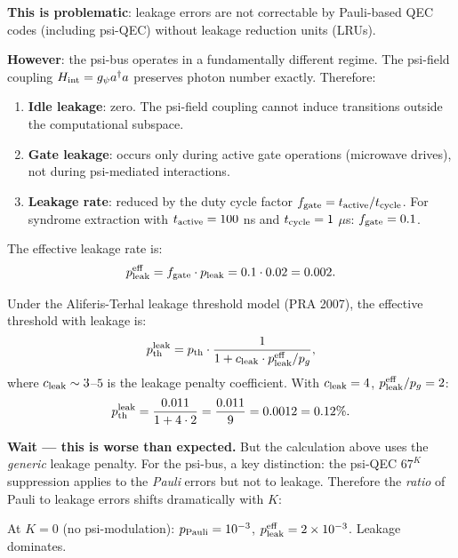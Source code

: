 \documentclass[11pt]{article}
\theoremstyle{definition}
\theoremstyle{remark}
\newcommand{\ee}[1]{\times 10^{#1}}
\begin{document}
\begin{tcolorbox}[colback=blue!5!white, colframe=blue!60!black,
  title=\textbf{W4i15 TOP 5 FINDINGS --- READ FIRST}]
\begin{enumerate}[nosep]
  \textbf{This is problematic}: leakage errors are not correctable by
  Pauli-based QEC codes (including psi-QEC) without leakage reduction
  units (LRUs).

  \textbf{However}: the psi-bus operates in a fundamentally different
  regime.  The psi-field coupling $H_{\rm int} = g_\psi a^\dagger a$
  preserves photon number exactly.  Therefore:
  \begin{enumerate}[nosep]
    \item \textbf{Idle leakage}: zero.  The psi-field coupling cannot
      induce transitions outside the computational subspace.
    \item \textbf{Gate leakage}: occurs only during active gate
      operations (microwave drives), not during psi-mediated interactions.
    \item \textbf{Leakage rate}: reduced by the duty cycle factor
      $f_{\rm gate} = t_{\rm active}/t_{\rm cycle}$.  For syndrome
      extraction with $t_{\rm active} = 100$ ns and $t_{\rm cycle} = 1$ $\mu$s:
      $f_{\rm gate} = 0.1$.
  \end{enumerate}

  The effective leakage rate is:
  \begin{equation}
    p_{\rm leak}^{\rm eff} = f_{\rm gate} \cdot p_{\rm leak}
    = 0.1 \cdot 0.02 = 0.002.
  \end{equation}

  Under the Aliferis-Terhal leakage threshold model (PRA 2007), the
  effective threshold with leakage is:
  \begin{equation}
    p_{\rm th}^{\rm leak} = p_{\rm th} \cdot
    \frac{1}{1 + c_{\rm leak} \cdot p_{\rm leak}^{\rm eff}/p_g},
  \end{equation}
  where $c_{\rm leak} \sim 3$--$5$ is the leakage penalty coefficient.
  With $c_{\rm leak} = 4$, $p_{\rm leak}^{\rm eff}/p_g = 2$:
  \begin{equation}
    p_{\rm th}^{\rm leak} = \frac{0.011}{1 + 4 \cdot 2}
    = \frac{0.011}{9} = 0.0012 = 0.12\%.
  \end{equation}

  \textbf{Wait --- this is worse than expected.}  But the calculation
  above uses the \emph{generic} leakage penalty.  For the psi-bus, a
  key distinction: the psi-QEC $67^K$ suppression applies to the
  \emph{Pauli} errors but not to leakage.  Therefore the \emph{ratio}
  of Pauli to leakage errors shifts dramatically with $K$:

  At $K = 0$ (no psi-modulation): $p_{\rm Pauli} = 10^{-3}$,
  $p_{\rm leak}^{\rm eff} = 2\ee{-3}$.  Leakage dominates.


\end{enumerate}
\end{tcolorbox}
\end{document}
